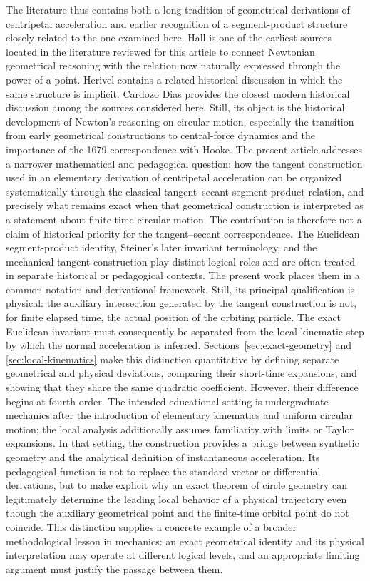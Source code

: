 \documentclass[preprint,12pt,3p,nopreprintline]{elsarticle}
\numberwithin{equation}{section}
\theoremstyle{remark}
\begin{document}
The literature thus contains both a long tradition of geometrical derivations of centripetal acceleration and earlier recognition of a segment-product structure closely related to the one examined here. Hall \cite{Hall01031957} is one of the earliest sources located in the literature reviewed for this article to connect Newtonian geometrical reasoning with the relation now naturally expressed through the power of a point. Herivel \cite{herivel1965background} contains a related historical discussion in which the same structure is implicit. Cardozo Dias \cite{dias2023newton} provides the closest modern historical discussion among the sources considered here. Still, its object is the historical development of Newton's reasoning on circular motion, especially the transition from early geometrical constructions to central-force dynamics and the importance of the 1679 correspondence with Hooke. The present article addresses a narrower mathematical and pedagogical question: how the tangent construction used in an elementary derivation of centripetal acceleration can be organized systematically through the classical tangent--secant segment-product relation, and precisely what remains exact when that geometrical construction is interpreted as a statement about finite-time circular motion. The contribution is therefore not a claim of historical priority for the tangent--secant correspondence.
The Euclidean segment-product identity, Steiner's later invariant terminology, and the mechanical tangent construction play distinct logical roles and are often treated in separate historical or pedagogical contexts. The present work places them in a common notation and derivational framework. Still, its principal qualification is physical: the auxiliary intersection generated by the tangent construction is not, for finite elapsed time, the actual position of the orbiting particle. The exact Euclidean invariant must consequently be separated from the local kinematic step by which the normal acceleration is inferred. Sections~\ref{sec:exact-geometry} and \ref{sec:local-kinematics} make this distinction quantitative by defining separate geometrical and physical deviations, comparing their short-time expansions, and showing that they share the same quadratic coefficient. However, their difference begins at fourth order. The intended educational setting is undergraduate mechanics after the introduction of elementary kinematics and uniform circular motion; the local analysis additionally assumes familiarity with limits or Taylor expansions. In that setting, the construction provides a bridge between synthetic geometry and the analytical definition of instantaneous acceleration. Its pedagogical function is not to replace the standard vector or differential derivations, but to make explicit why an exact theorem of circle geometry can legitimately determine the leading local behavior of a physical trajectory even though the auxiliary geometrical point and the finite-time orbital point do not coincide. This distinction supplies a concrete example of a broader methodological lesson in mechanics: an exact geometrical identity and its physical interpretation may operate at different logical levels, and an appropriate limiting argument must justify the passage between them.
\end{document}
